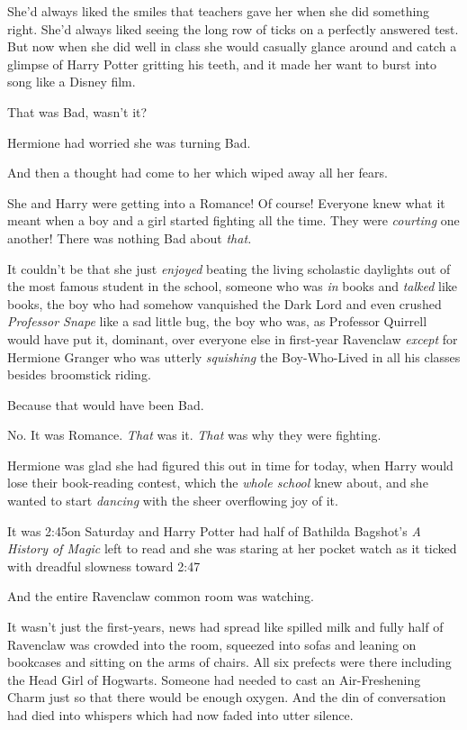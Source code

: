 She’d always liked the smiles that teachers gave her when she did something right. She’d always liked seeing the long row of ticks on a perfectly answered test. But now when she did well in class she would casually glance around and catch a glimpse of Harry Potter gritting his teeth, and it made her want to burst into song like a Disney film.

That was Bad, wasn’t it?

Hermione had worried she was turning Bad.

And then a thought had come to her which wiped away all her fears.

She and Harry were getting into a Romance! Of course! Everyone knew what it meant when a boy and a girl started fighting all the time. They were \emph{courting} one another! There was nothing Bad about \emph{that.}

It couldn’t be that she just \emph{enjoyed} beating the living scholastic daylights out of the most famous student in the school, someone who was \emph{in} books and \emph{talked} like books, the boy who had somehow vanquished the Dark Lord and even crushed \emph{Professor Snape} like a sad little bug, the boy who was, as Professor Quirrell would have put it, dominant, over everyone else in first-year Ravenclaw \emph{except} for Hermione Granger who was utterly \emph{squishing} the Boy-Who-Lived in all his classes besides broomstick riding.

Because that would have been Bad.

No. It was Romance. \emph{That} was it. \emph{That} was why they were fighting.

Hermione was glad she had figured this out in time for today, when Harry would lose their book-reading contest, which the \emph{whole school} knew about, and she wanted to start \emph{dancing} with the sheer overflowing joy of it.

It was 2:45\pm on Saturday and Harry Potter had half of Bathilda Bagshot’s \emph{A History of Magic} left to read and she was staring at her pocket watch as it ticked with dreadful slowness toward 2:47\pm

And the entire Ravenclaw common room was watching.

It wasn’t just the first-years, news had spread like spilled milk and fully half of Ravenclaw was crowded into the room, squeezed into sofas and leaning on bookcases and sitting on the arms of chairs. All six prefects were there including the Head Girl of Hogwarts. Someone had needed to cast an Air-Freshening Charm just so that there would be enough oxygen. And the din of conversation had died into whispers which had now faded into utter silence.

